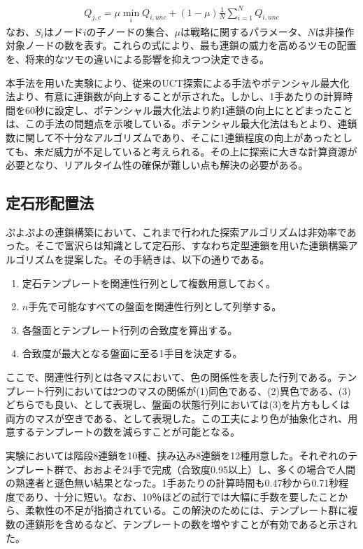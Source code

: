 \documentclass[12pt]{jsarticle}
\begin{document}
\begin{eqnarray} \label{fo:qj}
  Q_{j,c} = \mu \min_{i} Q_{i,unc}+(1-\mu)\frac{1}{N} \sum_{i=1}^{N} Q_{i,unc}
\end{eqnarray}
なお、$S_i$はノード$i$の子ノードの集合、$\mu$は戦略に関するパラメータ、$N$は非操作対象ノードの数を表す。これらの式により、最も連鎖の威力を高めるツモの配置を、将来的なツモの違いによる影響を抑えつつ決定できる。

本手法を用いた実験により、従来のUCT探索による手法やポテンシャル最大化法より、有意に連鎖数が向上することが示された。しかし、1手あたりの計算時間を60秒に設定し、ポテンシャル最大化法より約1連鎖の向上にとどまったことは、この手法の問題点を示唆している。ポテンシャル最大化法はもとより、連鎖数に関して不十分なアルゴリズムであり、そこに1連鎖程度の向上があったとしても、未だ威力が不足していると考えられる。その上に探索に大きな計算資源が必要となり、リアルタイム性の確保が難しい点も解決の必要がある。


\subsection{定石形配置法}
ぷよぷよの連鎖構築において、これまで行われた探索アルゴリズムは非効率であった。そこで富沢ら\cite{puyo_temp}は知識として定石形、すなわち定型連鎖を用いた連鎖構築アルゴリズムを提案した。その手続きは、以下の通りである。
\begin{enumerate}
\item 定石テンプレートを関連性行列として複数用意しておく。
\item $n$手先で可能なすべての盤面を関連性行列として列挙する。
\item 各盤面とテンプレート行列の合致度を算出する。
\item 合致度が最大となる盤面に至る1手目を決定する。
\end{enumerate}

ここで、関連性行列とは各マスにおいて、色の関係性を表した行列である。テンプレート行列においては2つのマスの関係が(1)同色である、(2)異色である、(3)どちらでも良い、として表現し、盤面の状態行列においては(3)を片方もしくは両方のマスが空きである、として表現した。この工夫により色が抽象化され、用意するテンプレートの数を減らすことが可能となる。

実験においては階段8連鎖を10種、挟み込み8連鎖を12種用意した。それぞれのテンプレート群で、おおよそ24手で完成（合致度0.95以上）し、多くの場合で人間の熟達者と遜色無い結果となった。1手あたりの計算時間も0.47秒から0.71秒程度であり、十分に短い。なお、10％ほどの試行では大幅に手数を要したことから、柔軟性の不足が指摘されている。この解決のためには、テンプレート群に複数の連鎖形を含めるなど、テンプレートの数を増やすことが有効であると示された。
\end{document}
